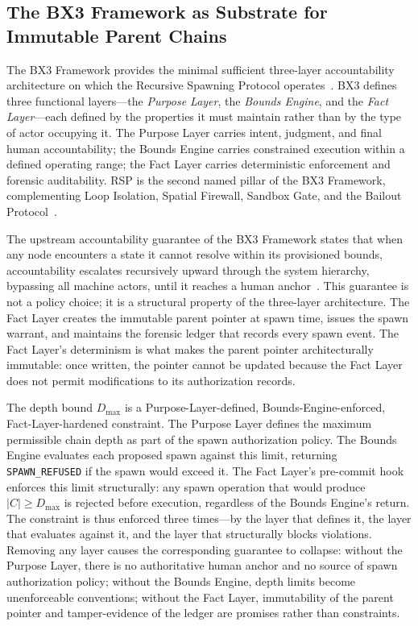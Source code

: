 \subsection{The BX3 Framework as Substrate for Immutable Parent Chains}

The BX3 Framework provides the minimal sufficient three-layer accountability architecture on which the Recursive Spawning Protocol operates~\cite{bx3-framework,bx3framework2026}. BX3 defines three functional layers---the \textit{Purpose Layer}, the \textit{Bounds Engine}, and the \textit{Fact Layer}---each defined by the properties it must maintain rather than by the type of actor occupying it. The Purpose Layer carries intent, judgment, and final human accountability; the Bounds Engine carries constrained execution within a defined operating range; the Fact Layer carries deterministic enforcement and forensic auditability. RSP is the second named pillar of the BX3 Framework, complementing Loop Isolation, Spatial Firewall, Sandbox Gate, and the Bailout Protocol~\cite{bx3-framework,bansal2019}.

The upstream accountability guarantee of the BX3 Framework states that when any node encounters a state it cannot resolve within its provisioned bounds, accountability escalates recursively upward through the system hierarchy, bypassing all machine actors, until it reaches a human anchor~\cite{bx3-framework,bx3framework2026}. This guarantee is not a policy choice; it is a structural property of the three-layer architecture. The Fact Layer creates the immutable parent pointer at spawn time, issues the spawn warrant, and maintains the forensic ledger that records every spawn event. The Fact Layer's determinism is what makes the parent pointer architecturally immutable: once written, the pointer cannot be updated because the Fact Layer does not permit modifications to its authorization records.

The depth bound $D_{\max}$ is a Purpose-Layer-defined, Bounds-Engine-enforced, Fact-Layer-hardened constraint. The Purpose Layer defines the maximum permissible chain depth as part of the spawn authorization policy. The Bounds Engine evaluates each proposed spawn against this limit, returning \texttt{SPAWN\_REFUSED} if the spawn would exceed it. The Fact Layer's pre-commit hook enforces this limit structurally: any spawn operation that would produce $|C| \geq D_{\max}$ is rejected before execution, regardless of the Bounds Engine's return. The constraint is thus enforced three times---by the layer that defines it, the layer that evaluates against it, and the layer that structurally blocks violations. Removing any layer causes the corresponding guarantee to collapse: without the Purpose Layer, there is no authoritative human anchor and no source of spawn authorization policy; without the Bounds Engine, depth limits become unenforceable conventions; without the Fact Layer, immutability of the parent pointer and tamper-evidence of the ledger are promises rather than constraints.

